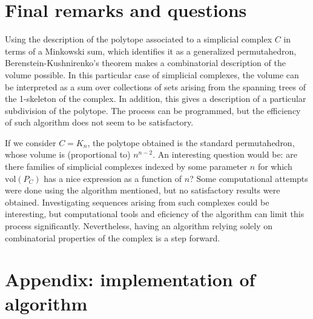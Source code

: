 \documentclass[english,11pt]{article}
\theoremstyle{definition}
\theoremstyle{definition}
\theoremstyle{definition}
\theoremstyle{remark}
\theoremstyle{definition}
\begin{document}
\section{Final remarks and questions}

Using the description of the polytope associated to a simplicial complex $C$ in terms of a Minkowski sum, which identifies it as a generalized permutahedron, Berenstein-Kushnirenko's theorem makes a combinatorial description of the volume possible. In this particular case of simplicial complexes, the volume can be interpreted as a sum over collections of sets arising from the spanning trees of the 1-skeleton of the complex. In addition, this gives a description of a particular subdivision of the polytope. The process can be programmed, but the efficiency of such algorithm does not seem to be satisfactory. 

If we consider $C=K_n$, the polytope obtained is the standard permutahedron, whose volume is (proportional to) $n^{n-2}$. An interesting question would be: are there families of simplicial complexes indexed by some parameter $n$ for which $\text{vol}(P_C)$ has a nice expression as a function of $n$? Some computational attempts were done using the algorithm mentioned, but no satisfactory results were obtained. Investigating sequences arising from such complexes could be interesting, but computational tools and eficiency of the algorithm can limit this process significantly. Nevertheless, having an algorithm relying solely on combinatorial properties of the complex is a step forward. 

\printbibliography

\newpage

\section{Appendix: implementation of algorithm}
\end{document}
